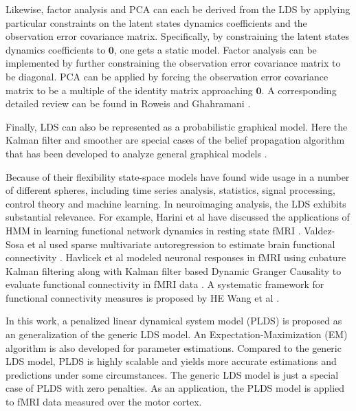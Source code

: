\documentclass[fleqn]{article}
\begin{document}
Likewise, factor analysis and PCA can each be derived from the LDS by applying particular constraints on the latent states dynamics coefficients and the observation error covariance matrix. Specifically, by constraining the latent states dynamics coefficients to $\mathbf{0}$, one gets a static model. Factor analysis can be implemented by further constraining the observation error covariance matrix to be diagonal. PCA can be applied by forcing the observation error covariance matrix to be a multiple of the identity matrix approaching $\mathbf{0}$. A corresponding detailed review can be found in Roweis and Ghahramani \cite{roweis1999unifying}.

Finally, LDS can also be represented as a probabilistic graphical model. Here the Kalman filter and smoother are special cases of the belief propagation algorithm that has been developed to analyze general graphical models \cite{lauritzen1988local}\cite{pearl1988probabilistic}.

Because of their flexibility state-space models have found wide usage in a number of different spheres, including time series analysis, statistics, signal processing, control theory and machine learning.  In neuroimaging analysis, the LDS exhibits substantial relevance. For example, Harini et al have discussed the applications of HMM in learning functional network dynamics in resting state fMRI \cite{eavani2013unsupervised}. Valdez-Sosa et al used sparse multivariate autoregression to estimate brain functional connectivity \cite{valdes2005estimating}. Havlicek et al modeled neuronal responses in fMRI using cubature Kalman filtering along with Kalman filter based Dynamic Granger Causality to evaluate functional connectivity in fMRI data \cite{havlicek2011dynamic}. A systematic framework for functional connectivity measures is proposed by HE Wang et al \cite{wang2014systematic}.

In this work, a penalized linear dynamical system model (PLDS) is proposed as an generalization of the generic LDS model. An Expectation-Maximization (EM) algorithm is also developed for parameter estimations. Compared to the generic LDS model, PLDS is highly scalable and yields more accurate estimations and predictions under some circumstances. The generic LDS model is just a special case of PLDS with zero penalties. As an application, the PLDS model is applied to fMRI data measured over the motor cortex.
\end{document}
